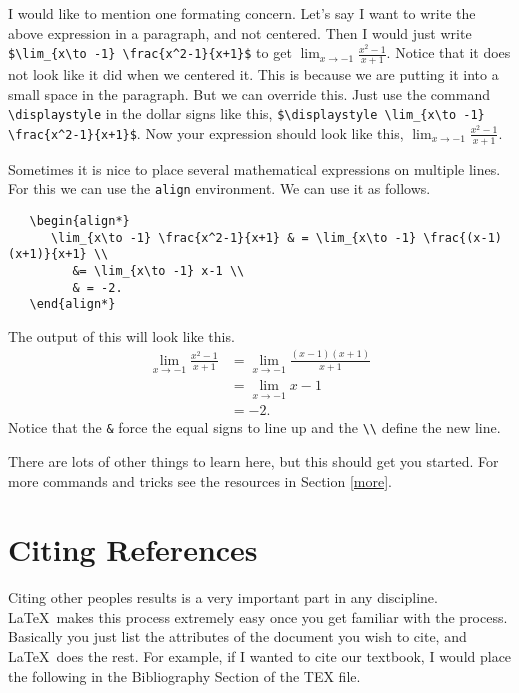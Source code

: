 \documentclass{amsart}
\begin{document}
   I would like to mention one formating concern. Let's say I want to write the above expression in a paragraph, and not centered. Then I would just write \verb|$\lim_{x\to -1} \frac{x^2-1}{x+1}$| to get $\lim_{x\to -1} \frac{x^2-1}{x+1}$. Notice that it does not look like it did when we centered it. This is because we are putting it into a small space in the paragraph. But we can override this. Just use the command \verb|\displaystyle| in the dollar signs like this, \verb|$\displaystyle \lim_{x\to -1} \frac{x^2-1}{x+1}$|. Now your expression should look like this, $\displaystyle \lim_{x\to -1} \frac{x^2-1}{x+1}$.


   Sometimes it is nice to place several mathematical expressions on multiple lines. For this we can use the \verb|align| environment. We can use it as follows.
   \begin{verbatim}
   \begin{align*}
      \lim_{x\to -1} \frac{x^2-1}{x+1} & = \lim_{x\to -1} \frac{(x-1)(x+1)}{x+1} \\
         &= \lim_{x\to -1} x-1 \\
         & = -2.
   \end{align*}
   \end{verbatim}
   The output of this will look like this.
   \begin{align*}
      \lim_{x\to -1} \frac{x^2-1}{x+1} & = \lim_{x\to -1} \frac{(x-1)(x+1)}{x+1} \\
         &= \lim_{x\to -1} x-1 \\
         & = -2.
   \end{align*}
   Notice that the \verb|&| force the equal signs to line up and the \verb|\\| define the new line. 



   There are lots of other things to learn here, but this should get you started. For more commands and tricks see the resources in Section \ref{more}.

   

\section{Citing References} \label{refs}

   Citing other peoples results is a very important part in any discipline. \LaTeX\ makes this process extremely easy once you get familiar with the process. Basically you just list the attributes of the document you wish to cite, and \LaTeX\ does the rest. For example, if I wanted to cite our textbook, I would place the following in the Bibliography Section of the TEX file.
\end{document}
